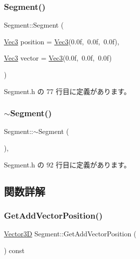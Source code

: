 \subsubsection{\texorpdfstring{Segment()}{Segment()}}
{\footnotesize\ttfamily Segment\+::\+Segment (\begin{DoxyParamCaption}\item[{\mbox{\hyperlink{_vector3_d_8h_ab16f59e4393f29a01ec8b9bbbabbe65d}{Vec3}}}]{position = {\ttfamily \mbox{\hyperlink{_vector3_d_8h_ab16f59e4393f29a01ec8b9bbbabbe65d}{Vec3}}(0.0f,~0.0f,~0.0f)},  }\item[{\mbox{\hyperlink{_vector3_d_8h_ab16f59e4393f29a01ec8b9bbbabbe65d}{Vec3}}}]{vector = {\ttfamily \mbox{\hyperlink{_vector3_d_8h_ab16f59e4393f29a01ec8b9bbbabbe65d}{Vec3}}(0.0f,~0.0f,~0.0f)} }\end{DoxyParamCaption})\hspace{0.3cm}{\ttfamily [inline]}}



 Segment.\+h の 77 行目に定義があります。

\mbox{\label{class_segment_a76b45a453304f1f485e3bc2fcad58b59}} 
\subsubsection{\texorpdfstring{$\sim$\+Segment()}{~Segment()}}
{\footnotesize\ttfamily Segment\+::$\sim$\+Segment (\begin{DoxyParamCaption}{ }\end{DoxyParamCaption})\hspace{0.3cm}{\ttfamily [inline]}, {\ttfamily [virtual]}}



 Segment.\+h の 92 行目に定義があります。



\subsection{関数詳解}
\mbox{\label{class_segment_a4223e990a42cc9e487ef51b82e63e777}} 
\subsubsection{\texorpdfstring{Get\+Add\+Vector\+Position()}{GetAddVectorPosition()}}
{\footnotesize\ttfamily \mbox{\hyperlink{class_vector3_d}{Vector3D}} Segment\+::\+Get\+Add\+Vector\+Position (\begin{DoxyParamCaption}{ }\end{DoxyParamCaption}) const\hspace{0.3cm}{\ttfamily [inline]}}



